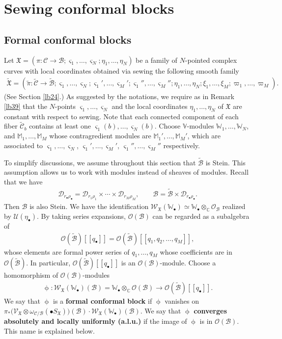 \documentclass[12pt,a4paper,notitlepage]{report}
\theoremstyle{definition}
\theoremstyle{plain}
\newcommand{\fk}{\mathfrak}
\newcommand{\mc}{\mathcal}
\newcommand{\wtd}{\widetilde}
\newcommand{\scr}{\mathscr}
\newcommand{\sgm}{\varsigma}
\newcommand{\blt}{\bullet}
\newcommand{\Vbb}{\mathbb V}
\newcommand{\Wbb}{\mathbb W}
\newcommand{\Mbb}{\mathbb M}
\newcommand{\Cbb}{\mathbb C}
\numberwithin{equation}{section}
\begin{document}
\section{Sewing  conformal blocks}\label{lb76}


\subsection*{Formal conformal blocks}


Let $\fk X=(\pi:\mc C\rightarrow\mc B;\sgm_1,\dots,\sgm_N;\eta_1,\dots,\eta_N)$ be a family of $N$-pointed complex curves with local coordinates obtained via sewing the following smooth family
\begin{align*}
\wtd{\fk X}=(\wtd\pi:\wtd{\mc C}\rightarrow\wtd{\mc B};\sgm_1,\dots,\sgm_N;\sgm_1',\dots,\sgm_M';\sgm_1'',\dots,\sgm_M'';\eta_1,\dots,\eta_N;\xi_1,\dots,\xi_M;\varpi_1,\dots,\varpi_M).
\end{align*}
(See Section \ref{lb24}.) As suggested by the notations, we require as in Remark \ref{lb39} that the $N$-points  $\sgm_1,\dots,\sgm_N$ and the local coordinates $\eta_1,\dots,\eta_N$ of $\fk X$ are constant with respect to sewing.  Note that each connected component of each fiber $\wtd{\mc C}_b$ contains at least one $\sgm_1(b),\dots,\sgm_N(b)$. Choose $\Vbb$-modules $\Wbb_1,\dots,\Wbb_N$, and $\Mbb_1,\dots,\Mbb_M$ whose contragredient modules are $\Mbb_1',\dots,\Mbb_M'$, which are associated to $\sgm_1,\dots,\sgm_N$, $\sgm_1',\dots,\sgm_M'$, $\sgm_1'',\dots,\sgm_M''$ respectively.


To simplify discussions, we assume throughout this section that $\wtd{\mc B}$ is Stein. This assumption allows us to work with modules instead of sheaves of modules. Recall that we have
\begin{align*}
\mc D_{r_\bullet\rho_\bullet}=\mc D_{r_1\rho_1}\times\cdots\times\mc D_{r_M\rho_M},\qquad\mc B=\wtd{\mc B}\times \mc D_{r_\bullet\rho_\bullet}.
\end{align*}
Then $\mc B$ is also Stein.  We have the identification $\scr W_{\fk X}(\Wbb_\blt)\simeq \Wbb_\blt\otimes_{\Cbb}\scr O_{\mc B}$ realized by $\mc U(\eta_\blt)$. By taking series expansions,  $\scr O(\mc B)$ can be regarded as a subalgebra of
\begin{align*}
\scr O(\wtd{\mc B})[[q_\blt]]=\scr O(\wtd{\mc B})[[q_1,q_2,\dots,q_M]],
\end{align*}
whose elements are formal power series of $q_1,\dots,q_M$ whose coefficients are in $\scr O(\wtd{\mc B})$. In particular, $\scr O(\wtd{\mc B})[[q_\blt]]$ is an $\scr O(\mc B)$-module. Choose a homomorphism of $\scr O(\mc B)$-modules
\begin{align}
\upphi:\scr W_{\fk X}(\Wbb_\blt)(\mc B)=\Wbb_\blt\otimes_\Cbb\scr O(\mc B)\rightarrow\scr O(\wtd{\mc B})[[q_\blt]].\label{eq102}
\end{align}
We say that $\upphi$ is a \textbf{formal conformal block} if $\upphi$ vanishes on $\pi_*\big(\scr V_{\fk X}\otimes\omega_{\mc C/\mc B}(\blt S_{\fk X})\big)(\mc B)\cdot \scr W_{\fk X}(\Wbb_\blt)(\mc B)$. We say that $\upphi$ \textbf{converges absolutely and locally uniformly (a.l.u.)} if the image of $\upphi$ is in $\scr O(\mc B)$. This name is explained below.
\end{document}

